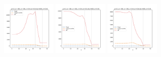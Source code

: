 \documentclass[a4paper]{article}
\begin{document}
\begin{figure}[H]
  \includegraphics[width=0.23\textwidth]{grid-g4-v6-w2_0}
  \includegraphics[width=0.23\textwidth]{grid-g4-v6-w3_0}
  \includegraphics[width=0.23\textwidth]{grid-g4-v6-w4_0}
\end{figure}
\end{document}
